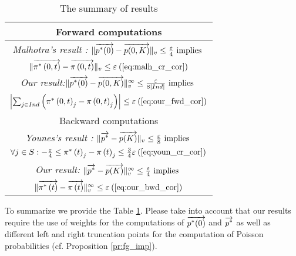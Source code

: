 \documentclass[times, 10pt,twocolumn]{article}
\begin{document}
		{\small
		\begin{table}
			\caption{The summary of results}
			\label{tbl:summ}
			\begin{center}
				\begin{tabular}{|l|c|}
					\hline
					\multicolumn{2}{|c|}{Forward computations} \\
					\hline
					\multicolumn{2}{|c|}{\emph{Malhotra's result \cite{MalhotraMT_MR94}:}  $\lVert \overrightarrow{p^{*}(0)} - \overrightarrow{p(0,K)} \rVert_{v} \leq \frac{\varepsilon}{4} \text{ implies }$}\\
					\multicolumn{2}{|c|}{$\lVert \overrightarrow{\pi^{*} \left(0, t \right )} - \overrightarrow{\pi \left(0, t \right )} \rVert_{v} \leq \varepsilon \: (\ref{eq:malh_cr_cor})$ } \\
					\hline
					\multicolumn{2}{|c|}{\emph{Our result:}$\lVert  \overrightarrow{p^{*}(0)} - \overrightarrow{p(0,K)}  \rVert_{v}^{\infty} \leq \frac{\varepsilon}{8 |Ind|} \text{ implies }$}\\
					\multicolumn{2}{|c|}{$\left| \sum_{j \in Ind} \left( \pi^{*} \left(0, t \right )_{j} - \pi \left(0, t \right )_{j} \right) \right| \leq \varepsilon \: (\ref{eq:our_fwd_cor})$}\\
					\hline
					\multicolumn{2}{|c|}{Backward computations} \\
					\hline
					\multicolumn{2}{|c|}{\emph{Younes's result \cite{YounesKNP_STTT05}:} $\lVert \overrightarrow{p^{*}} - \overrightarrow{p(K)} \rVert_{v} \leq \frac{\varepsilon}{8} \text{ implies }$}\\
					\multicolumn{2}{|c|}{$\forall j \in S : -\frac{\varepsilon}{4} \leq \pi^{*} \left( t \right)_{j} - \pi \left( t \right)_{j} \leq \frac{3}{4}\varepsilon \: (\ref{eq:youn_cr_cor})$}\\
					\hline
					\multicolumn{2}{|c|}{\emph{Our result:} $\lVert  \overrightarrow{p^{*}} - \overrightarrow{p(K)}  \rVert_{v}^{\infty} \leq \frac{\varepsilon}{4} \text{ implies }$}\\
					\multicolumn{2}{|c|}{$\lVert  \overrightarrow{\pi^{*} \left( t \right)} - \overrightarrow{\pi \left( t \right) }  \rVert_{v}^{\infty}\leq \varepsilon \: (\ref{eq:our_bwd_cor})$}\\
					\hline
				\end{tabular}
			\end{center}
			\vspace{-0.7cm}
		\end{table}
		}
		To summarize we provide the Table \ref{tbl:summ}. Please take into account that our results require the use of weights for the computations of $\overrightarrow{p^{*}(0)}$ and $\overrightarrow{p^{*}}$ as well as different left and right truncation points for the computation of Poisson probabilities (cf. Proposition \ref{pr:fg_imp}).
\end{document}
